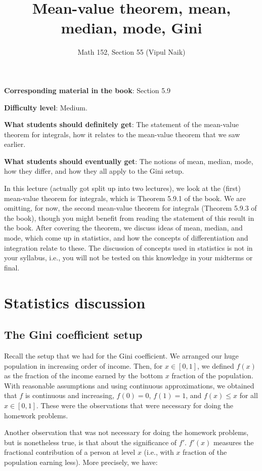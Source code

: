 \documentclass{amsart}
\title{Mean-value theorem, mean, median, mode, Gini}
\author{Math 152, Section 55 (Vipul Naik)}
\begin{document}
\maketitle

{\bf Corresponding material in the book}: Section 5.9

{\bf Difficulty level}: Medium.

{\bf What students should definitely get}: The statement of the
mean-value theorem for integrals, how it relates to the mean-value
theorem that we saw earlier.

{\bf What students should eventually get}: The notions of mean,
median, mode, how they differ, and how they all apply to the Gini
setup.


In this lecture (actually got split up into two lectures), we look at
the (first) mean-value theorem for integrals, which is Theorem 5.9.1
of the book. We are omitting, for now, the second mean-value theorem
for integrals (Theorem 5.9.3 of the book), though you might benefit
from reading the statement of this result in the book. After covering
the theorem, we discuss ideas of mean, median, and mode, which come up
in statistics, and how the concepts of differentiation and integration
relate to these. The discussion of concepts used in statistics is not
in your syllabus, i.e., you will not be tested on this knowledge in
your midterms or final.


\section{Statistics discussion}
\subsection*{The Gini coefficient setup}

Recall the setup that we had for the Gini coefficient. We arranged our
huge population in increasing order of income. Then, for $x \in
[0,1]$, we defined $f(x)$ as the fraction of the income earned by the
bottom $x$ fraction of the population. With reasonable assumptions and
using continuous approximations, we obtained that $f$ is continuous
and increasing, $f(0) = 0$, $f(1) = 1$, and $f(x) \le x$ for all $x
\in [0,1]$. These were the observations that were necessary for doing
the homework problems.

Another observation that was not necessary for doing the homework
problems, but is nonetheless true, is that about the significance of
$f'$. $f'(x)$ measures the fractional contribution of a person at
level $x$ (i.e., with $x$ fraction of the population earning
less). More precisely, we have:
\end{document}
